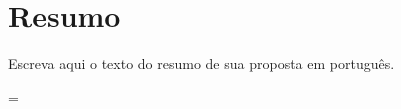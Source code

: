 \documentclass[a4paper,titlepage,12pt]{article}
\begin{document}

\pagestyle{plain}


\section*{Resumo}

\vspace{3cm}

Escreva aqui o texto do resumo de sua proposta em português. \lipsum[1]

\clearpage



\tableofcontents
\newpage



\pagestyle{plain}
\setcounter{page}{1}

\pagestyle{fancy}
\addtolength{\headwidth}{\marginparsep}\addtolength{\headwidth}{\marginparwidth}\headwidth
= \textwidth
\renewcommand{\sectionmark}[1]{\markright{\thesection\ #1}}\lhead[\fancyplain{}{\bfseries\thepage}]%
         {\fancyplain{}{\emph{\rightmark}}}\rhead[\fancyplain{}{\bfseries\leftmark}]%
             {\fancyplain{}{\bfseries\thepage}}\cfoot{}








\newpage



\newpage


\end{document}
